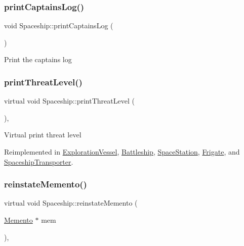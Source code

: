 \mbox{\label{classSpaceship_a949e9815b99d5598da2239e307036141}} 
\subsubsection{\texorpdfstring{print\+Captains\+Log()}{printCaptainsLog()}}
{\footnotesize\ttfamily void Spaceship\+::print\+Captains\+Log (\begin{DoxyParamCaption}{ }\end{DoxyParamCaption})}

Print the captains log \mbox{\label{classSpaceship_a8f16814f888a5a1423e5a491329cdb97}} 
\subsubsection{\texorpdfstring{print\+Threat\+Level()}{printThreatLevel()}}
{\footnotesize\ttfamily virtual void Spaceship\+::print\+Threat\+Level (\begin{DoxyParamCaption}{ }\end{DoxyParamCaption})\hspace{0.3cm}{\ttfamily [inline]}, {\ttfamily [virtual]}}

Virtual print threat level 

Reimplemented in \hyperlink{classExplorationVessel_af08a3db5b456781106f33a03bfbe7621}{Exploration\+Vessel}, \hyperlink{classBattleship_a41f44a1437e169165b943c3b98316f32}{Battleship}, \hyperlink{classSpaceStation_a430ee680ac20af8245640e9271095688}{Space\+Station}, \hyperlink{classFrigate_a97f2fd73f269ee81e6f8185110769cc5}{Frigate}, and \hyperlink{classSpaceshipTransporter_ae153196ed515ac051be2ef7aa225c064}{Spaceship\+Transporter}.

\mbox{\label{classSpaceship_ab075c869473344b6471c8e28ca7ea61e}} 
\subsubsection{\texorpdfstring{reinstate\+Memento()}{reinstateMemento()}}
{\footnotesize\ttfamily virtual void Spaceship\+::reinstate\+Memento (\begin{DoxyParamCaption}\item[{\hyperlink{classMemento}{Memento} $\ast$}]{mem }\end{DoxyParamCaption})\hspace{0.3cm}{\ttfamily [inline]}, {\ttfamily [virtual]}}

